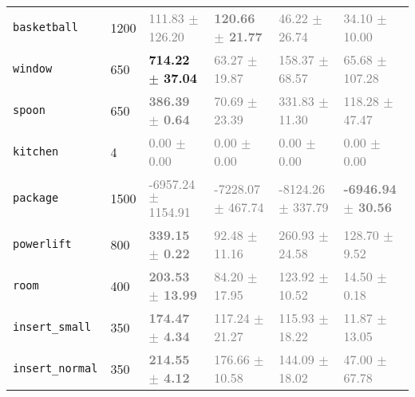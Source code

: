 \begin{table}[htbp]
\begin{tabular}{l|l|llll}
\texttt{basketball} & 1200 & \textcolor{gray}{111.83 $\pm$ 126.20} & \textbf{\textcolor{gray}{120.66 $\pm$ 21.77}} & \textcolor{gray}{46.22 $\pm$ 26.74} & \textcolor{gray}{34.10 $\pm$ 10.00} \\ 
\texttt{window} & 650 & \textbf{714.22 $\pm$ 37.04} & \textcolor{gray}{63.27 $\pm$ 19.87} & \textcolor{gray}{158.37 $\pm$ 68.57} & \textcolor{gray}{65.68 $\pm$ 107.28} \\ 
\texttt{spoon} & 650 & \textbf{\textcolor{gray}{386.39 $\pm$ 0.64}} & \textcolor{gray}{70.69 $\pm$ 23.39} & \textcolor{gray}{331.83 $\pm$ 11.30} & \textcolor{gray}{118.28 $\pm$ 47.47} \\ 
\texttt{kitchen} & 4 & \textcolor{gray}{0.00 $\pm$ 0.00} & \textcolor{gray}{0.00 $\pm$ 0.00} & \textcolor{gray}{0.00 $\pm$ 0.00} & \textcolor{gray}{0.00 $\pm$ 0.00} \\ 
\texttt{package} & 1500 & \textcolor{gray}{-6957.24 $\pm$ 1154.91} & \textcolor{gray}{-7228.07 $\pm$ 467.74} & \textcolor{gray}{-8124.26 $\pm$ 337.79} & \textbf{\textcolor{gray}{-6946.94 $\pm$ 30.56}} \\ 
\texttt{powerlift} & 800 & \textbf{\textcolor{gray}{339.15 $\pm$ 0.22}} & \textcolor{gray}{92.48 $\pm$ 11.16} & \textcolor{gray}{260.93 $\pm$ 24.58} & \textcolor{gray}{128.70 $\pm$ 9.52} \\ 
\texttt{room} & 400 & \textbf{\textcolor{gray}{203.53 $\pm$ 13.99}} & \textcolor{gray}{84.20 $\pm$ 17.95} & \textcolor{gray}{123.92 $\pm$ 10.52} & \textcolor{gray}{14.50 $\pm$ 0.18} \\ 
\texttt{insert\_small} & 350 & \textbf{\textcolor{gray}{174.47 $\pm$ 4.34}} & \textcolor{gray}{117.24 $\pm$ 21.27} & \textcolor{gray}{115.93 $\pm$ 18.22} & \textcolor{gray}{11.87 $\pm$ 13.05} \\ 
\texttt{insert\_normal} & 350 & \textbf{\textcolor{gray}{214.55 $\pm$ 4.12}} & \textcolor{gray}{176.66 $\pm$ 10.58} & \textcolor{gray}{144.09 $\pm$ 18.02} & \textcolor{gray}{47.00 $\pm$ 67.78} \\ \bottomrule
\end{tabular}
\end{table}
